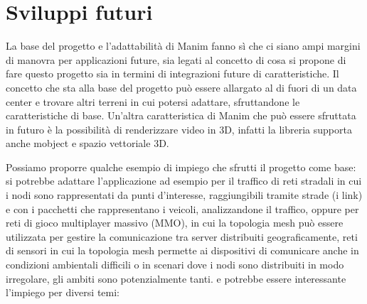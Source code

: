 \documentclass[binding=0.6cm]{sapthesis}
\begin{document}
\section{Sviluppi futuri}
La base del progetto e l'adattabilità di Manim fanno sì che ci siano ampi margini di manovra per applicazioni future, 
sia legati al concetto di cosa si propone di fare questo progetto sia in termini di integrazioni future di caratteristiche. 
Il concetto che sta alla base del progetto può essere allargato al di fuori di un data center e trovare
altri terreni in cui potersi adattare, sfruttandone le caratteristiche di base.
Un'altra caratteristica di Manim che può essere sfruttata in futuro è la possibilità di renderizzare video in 3D, infatti la libreria 
supporta anche mobject e spazio vettoriale 3D.

Possiamo proporre qualche esempio di impiego che sfrutti il progetto come base:
si potrebbe adattare l'applicazione 
ad esempio per il traffico di reti stradali in cui 
i nodi sono rappresentati da punti d'interesse, raggiungibili tramite strade (i link) e con i pacchetti che rappresentano i veicoli, 
analizzandone il traffico, oppure per reti di gioco multiplayer massivo (MMO), in cui la topologia mesh può essere utilizzata per gestire 
la comunicazione tra server distribuiti geograficamente, reti di sensori 
in cui la topologia mesh permette ai dispositivi di comunicare anche in condizioni ambientali difficili o in scenari dove i nodi sono 
distribuiti in modo irregolare, gli ambiti sono potenzialmente tanti.
 e potrebbe essere interessante l'impiego per diversi temi:
\end{document}
